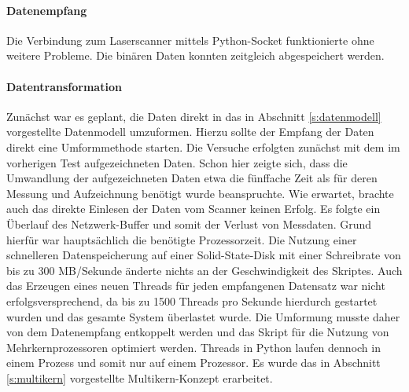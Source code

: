 \documentclass[a4paper,12pt,bibliography=totoc, listof=totoc,titlepage]{scrreprt}
\begin{document}
\paragraph{Datenempfang}
Die Verbindung zum Laserscanner mittels Python-Socket funktionierte ohne weitere Probleme. Die binären Daten konnten zeitgleich abgespeichert werden.

\paragraph{Datentransformation}
Zunächst war es geplant, die Daten direkt in das in Abschnitt \ref{s:datenmodell} vorgestellte Datenmodell umzuformen. Hierzu sollte der Empfang der Daten direkt eine Umformmethode starten. Die Versuche erfolgten zunächst mit dem im vorherigen Test aufgezeichneten Daten. Schon hier zeigte sich, dass die Umwandlung der aufgezeichneten Daten etwa die fünffache Zeit als für deren Messung und Aufzeichnung benötigt wurde beanspruchte. Wie erwartet, brachte auch das direkte Einlesen der Daten vom Scanner keinen Erfolg. Es folgte ein Überlauf des Netzwerk-Buffer und somit der Verlust von Messdaten. Grund hierfür war hauptsächlich die benötigte Prozessorzeit. Die Nutzung einer schnelleren Datenspeicherung auf einer Solid-State-Disk mit einer Schreibrate von bis zu 300 MB/Sekunde änderte nichts an der Geschwindigkeit des Skriptes. Auch das Erzeugen eines neuen Threads für jeden empfangenen Datensatz war nicht erfolgsversprechend, da bis zu 1500 Threads pro Sekunde hierdurch gestartet wurden und das gesamte System überlastet wurde. Die Umformung musste daher von dem Datenempfang entkoppelt werden und das Skript für die Nutzung von Mehrkernprozessoren optimiert werden. Threads in Python laufen dennoch in einem Prozess und somit nur auf einem Prozessor. Es wurde das in Abschnitt \ref{s:multikern} vorgestellte Multikern-Konzept erarbeitet.
\end{document}
